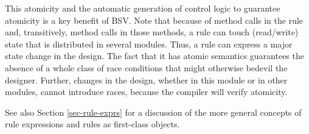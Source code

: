\documentclass[twoside,letterpaper]{article}
\newcommand{\BSV}{BSV}
\newcommand{\te}[1]{\texttt{#1}}
\newcommand{\nterm}[1]{\emph{#1}}
\begin{document}
This atomicity and the automatic generation of control logic to
guarantee atomicity is a key benefit of {\BSV}.  Note that because of
method calls in the rule and, transitively, method calls in those
methods, a rule can touch (read/write) state that is distributed in
several modules.  Thus, a rule can express a major state change in the
design.  The fact that it has atomic semantics guarantees the absence
of a whole class of race conditions that might otherwise bedevil the
designer.  Further, changes in the design, whether in this module or
in other modules, cannot introduce races, because the compiler will
verify atomicity.

See also Section \ref{sec-rule-exprs} for a discussion of the more
general concepts of rule expressions and rules as first-class objects.








\end{document}
